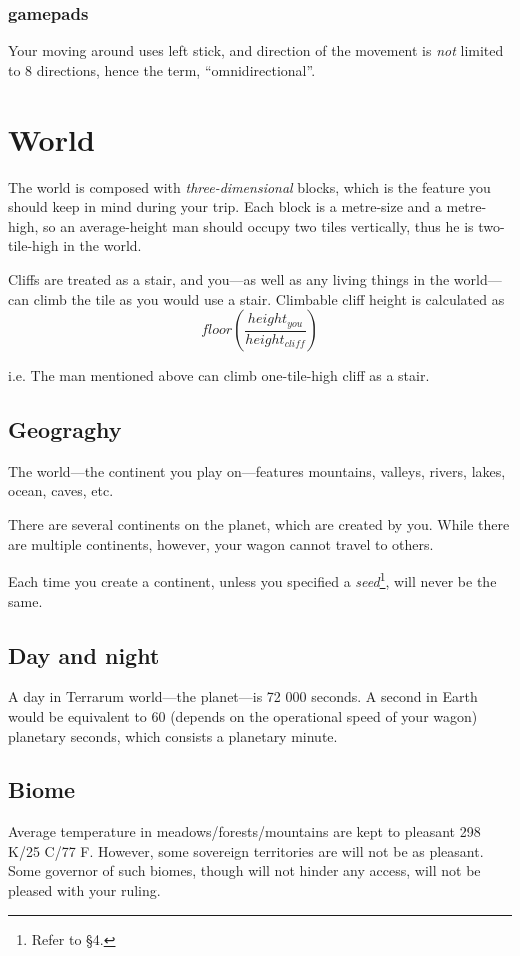 \documentclass[stock,9pt,nohan]{oblivoir}
\begin{document}
	\subsubsection{gamepads}
	Your moving around uses left stick, and direction of the movement is \emph{not} limited to 8 directions, hence the term, “omni\-direc\-tion\-al”.

\section{World}
The world is composed with \emph{three-dimensional} blocks, which is the feature you should keep in mind during your trip. Each block is a metre-size and a metre-high, so an average-height man should occupy two tiles vertically, thus he is two-tile-high in the world.

Cliffs are treated as a stair, and you---as well as any living things in the world---can climb the tile as you would use a stair. Climbable cliff height is calculated as
\begin{equation}
floor( \frac{height_{you}}{height_{\mathit{cliff}}} )
\end{equation}

i.e. The man mentioned above can climb one-tile-high cliff as a stair.

	\subsection{Geograghy}
	The world---the continent you play on---features mountains, valleys, rivers, lakes, ocean, caves, etc.
	
	There are several continents on the planet, which are created by you. While there are multiple continents, however, your wagon cannot travel to others.
	
	Each time you create a continent, unless you specified a \emph{seed}\footnote{Refer to \S 4.}, will never be the same.
	
	\subsection{Day and night}
	A day in Terrarum world---the planet---is 72 000 seconds. A second in Earth would be equivalent to 60 (depends on the operational speed of your wagon) planetary seconds, which consists a planetary minute.
	
	\subsection{Biome}
	Average temperature in meadows\slash forests\slash mountains are kept to pleasant 298 K\slash 25 \degree{}C\slash 77 \degree{}F. However, some sovereign territories are will not be as pleasant. Some governor of such biomes, though will not hinder any access, will not be pleased with your ruling.
	
\end{document}
